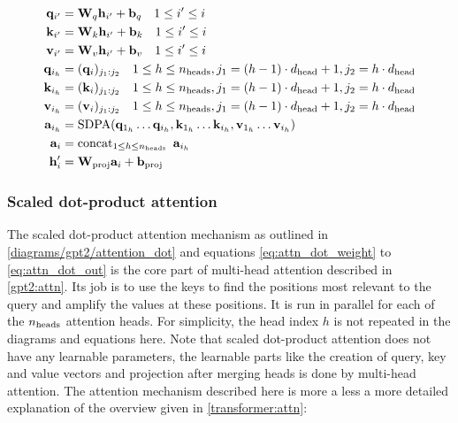 \begin{align}
\mathbf{q}_{i'} &= \mathbf{W}_q \modHidden_{i'} + \mathbf{b}_q
\quad 1 \leq i' \leq i
\label{eq:mha:q}
\\
\mathbf{k}_{i'} &= \mathbf{W}_k \modHidden_{i'} + \mathbf{b}_k
\quad 1 \leq i' \leq i
\label{eq:mha:k}
\\
\mathbf{v}_{i'} &= \mathbf{W}_v \modHidden_{i'} + \mathbf{b}_v
\quad 1 \leq i' \leq i
\label{eq:mha:v}
\\
\mathbf{q}_{i_h} &= (\mathbf{q}_i)_{j_1:j_2}
\quad 1 \leq h \leq \nHeads, j_1 = (h-1) \cdot \dHead + 1, j_2 = h \cdot \dHead
\label{eq:mha:qh}
\\
\mathbf{k}_{i_h} &= (\mathbf{k}_i)_{j_1:j_2}
\quad 1 \leq h \leq \nHeads, j_1 = (h-1) \cdot \dHead + 1, j_2 = h \cdot \dHead
\label{eq:mha:kh}
\\
\mathbf{v}_{i_h} &= (\mathbf{v}_i)_{j_1:j_2}
\quad 1 \leq h \leq \nHeads, j_1 = (h-1) \cdot \dHead + 1, j_2 = h \cdot \dHead
\label{eq:mha:vh}
\\
\mathbf{a}_{i_h} &= \operatorname{SDPA}(
	\mathbf{q}_{1_h} \ldots \mathbf{q}_{i_h},
	\mathbf{k}_{1_h} \ldots \mathbf{k}_{i_h},
	\mathbf{v}_{1_h} \ldots \mathbf{v}_{i_h}
)
\label{eq:mha:sdpa}
\\
\mathbf{a}_i &= \operatorname{concat}_{1 \leq h \leq \nHeads} \ \mathbf{a}_{i_h}
\label{eq:mha:concat}
\\
\modHidden'_i &= \mathbf{W}_{\mathrm{proj}} \mathbf{a}_i + \mathbf{b}_\mathrm{proj}
\label{eq:mha:output}
\end{align}




\subsubsection{Scaled dot-product attention}
\label{gpt2:attn_dot}
The scaled dot-product attention mechanism as outlined in \cref{diagrams/gpt2/attention_dot} and equations \eqref{eq:attn_dot_weight} to \eqref{eq:attn_dot_out} is the core part of multi-head attention described in \cref{gpt2:attn}.
Its job is to use the keys to find the positions most relevant to the query and amplify the values at these positions.
It is run in parallel for each of the ${n_\textrm{heads}}$ attention heads. For simplicity, the head index $h$ is not repeated in the diagrams and equations here.
Note that scaled dot-product attention does not have any learnable parameters, the learnable parts like the creation of query, key and value vectors and projection after merging heads is done by multi-head attention.
The attention mechanism described here is more a less a more detailed explanation of the overview given in \cref{transformer:attn}:

